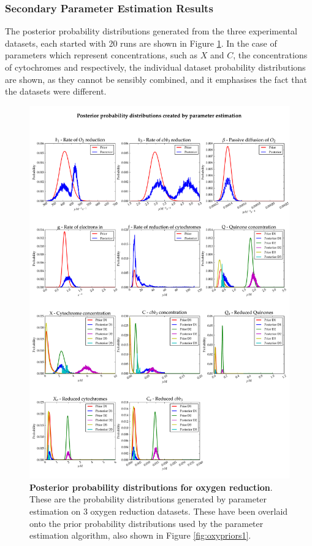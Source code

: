 \subsubsection{Secondary Parameter Estimation Results}
The posterior probability distributions generated from the three experimental datasets, each started with 20 runs are shown in Figure \ref{fig:oxyposteriors1}. In the case of parameters which represent concentrations, such as $X$ and $C$, the concentrations of cytochromes and \cbbthree{} respectively, the individual dataset probability distributions are shown, as they cannot be sensibly combined, and it emphasises the fact that the datasets were different.
\begin{figure}[p]
 \centering
 \includegraphics[width=15cm, trim=0cm 0cm 0cm 0cm]{./05-oxygenreduction/data/posteriors2.pdf}
 \caption[Posterior probability distributions for oxygen reduction]{{\bf Posterior probability distributions for oxygen reduction}. These are the probability distributions generated by parameter estimation on 3 oxygen reduction datasets. These have been overlaid onto the prior probability distributions used by the parameter estimation algorithm, also shown in Figure \ref{fig:oxypriors1}.
 \label{fig:oxyposteriors1}}
\end{figure}
\afterpage{\clearpage}
